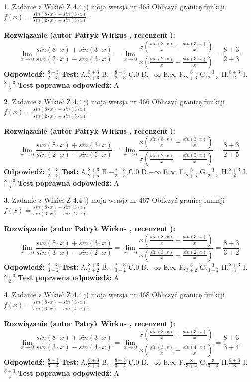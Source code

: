 \documentclass[12pt, a4paper]{article}
\theoremstyle{definition} %
\newtheorem{zad}{}
\newcommand{\zadStart}[1]{\begin{zad}#1\newline}
\newcommand{\zadStop}{\end{zad}}
\newcommand{\rozwStart}[2]{\noindent \textbf{Rozwiązanie (autor #1 , recenzent #2): }\newline}
\newcommand{\rozwStop}{\newline}
\newcommand{\odpStart}{\noindent \textbf{Odpowiedź:}\newline}
\newcommand{\odpStop}{\newline}
\newcommand{\testStart}{\noindent \textbf{Test:}\newline}
\newcommand{\testStop}{\newline}
\newcommand{\kluczStart}{\noindent \textbf{Test poprawna odpowiedź:}\newline}
\newcommand{\kluczStop}{\newline}
\begin{document}
\zadStart{Zadanie z Wikieł Z 4.4 j) moja wersja nr 465}
Obliczyć granicę funkcji $f(x)=\frac{sin(8\cdot x) +sin(3\cdot x)}{sin(2\cdot x) -sin(3\cdot x)}$.
\zadStop
\rozwStart{Patryk Wirkus}{}
$$\lim\limits_{x\to 0}\frac{sin(8\cdot x) +sin(3\cdot x)}{sin(2\cdot x) -sin(3\cdot x)}=\lim\limits_{x\to 0}\frac{x(\frac{sin(8\cdot x)}{x}+\frac{sin(3\cdot x)}{x})}{x(\frac{sin(2\cdot x)}{x}-\frac{sin(3\cdot x)}{x})}=\frac{8+3}{2+3}$$
\rozwStop
\odpStart
$\frac{8+3}{2+3}$
\odpStop
\testStart
A.$\frac{8+3}{2+3}$
B.$-\frac{8+3}{2+3}$
C.$0$
D.$-\infty$
E.$\infty$
F.$\frac{8}{2+3}$
G.$\frac{3}{2+3}$
H.$\frac{8+3}{2}$
I.$\frac{8+3}{3}$
\testStop
\kluczStart
A
\kluczStop



\zadStart{Zadanie z Wikieł Z 4.4 j) moja wersja nr 466}
Obliczyć granicę funkcji $f(x)=\frac{sin(8\cdot x) +sin(3\cdot x)}{sin(2\cdot x) -sin(5\cdot x)}$.
\zadStop
\rozwStart{Patryk Wirkus}{}
$$\lim\limits_{x\to 0}\frac{sin(8\cdot x) +sin(3\cdot x)}{sin(2\cdot x) -sin(5\cdot x)}=\lim\limits_{x\to 0}\frac{x(\frac{sin(8\cdot x)}{x}+\frac{sin(3\cdot x)}{x})}{x(\frac{sin(2\cdot x)}{x}-\frac{sin(5\cdot x)}{x})}=\frac{8+3}{2+5}$$
\rozwStop
\odpStart
$\frac{8+3}{2+5}$
\odpStop
\testStart
A.$\frac{8+3}{2+5}$
B.$-\frac{8+3}{2+5}$
C.$0$
D.$-\infty$
E.$\infty$
F.$\frac{8}{2+5}$
G.$\frac{3}{2+5}$
H.$\frac{8+3}{2}$
I.$\frac{8+3}{5}$
\testStop
\kluczStart
A
\kluczStop



\zadStart{Zadanie z Wikieł Z 4.4 j) moja wersja nr 467}
Obliczyć granicę funkcji $f(x)=\frac{sin(8\cdot x) +sin(3\cdot x)}{sin(3\cdot x) -sin(2\cdot x)}$.
\zadStop
\rozwStart{Patryk Wirkus}{}
$$\lim\limits_{x\to 0}\frac{sin(8\cdot x) +sin(3\cdot x)}{sin(3\cdot x) -sin(2\cdot x)}=\lim\limits_{x\to 0}\frac{x(\frac{sin(8\cdot x)}{x}+\frac{sin(3\cdot x)}{x})}{x(\frac{sin(3\cdot x)}{x}-\frac{sin(2\cdot x)}{x})}=\frac{8+3}{3+2}$$
\rozwStop
\odpStart
$\frac{8+3}{3+2}$
\odpStop
\testStart
A.$\frac{8+3}{3+2}$
B.$-\frac{8+3}{3+2}$
C.$0$
D.$-\infty$
E.$\infty$
F.$\frac{8}{3+2}$
G.$\frac{3}{3+2}$
H.$\frac{8+3}{3}$
I.$\frac{8+3}{2}$
\testStop
\kluczStart
A
\kluczStop



\zadStart{Zadanie z Wikieł Z 4.4 j) moja wersja nr 468}
Obliczyć granicę funkcji $f(x)=\frac{sin(8\cdot x) +sin(3\cdot x)}{sin(3\cdot x) -sin(4\cdot x)}$.
\zadStop
\rozwStart{Patryk Wirkus}{}
$$\lim\limits_{x\to 0}\frac{sin(8\cdot x) +sin(3\cdot x)}{sin(3\cdot x) -sin(4\cdot x)}=\lim\limits_{x\to 0}\frac{x(\frac{sin(8\cdot x)}{x}+\frac{sin(3\cdot x)}{x})}{x(\frac{sin(3\cdot x)}{x}-\frac{sin(4\cdot x)}{x})}=\frac{8+3}{3+4}$$
\rozwStop
\odpStart
$\frac{8+3}{3+4}$
\odpStop
\testStart
A.$\frac{8+3}{3+4}$
B.$-\frac{8+3}{3+4}$
C.$0$
D.$-\infty$
E.$\infty$
F.$\frac{8}{3+4}$
G.$\frac{3}{3+4}$
H.$\frac{8+3}{3}$
I.$\frac{8+3}{4}$
\testStop
\kluczStart
A
\kluczStop
\end{document}

